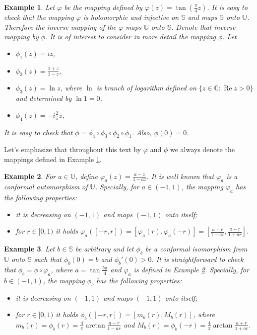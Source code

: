 \documentclass{amsart}
\newcommand{\re}{\mathop{\mathrm{Re}}}
\newtheorem{example}{Example}
\begin{document}
\begin{example}\label{exa:phi}
Let $\varphi$ be the mapping defined by $\displaystyle\varphi(z)=\tan{\left(\frac{\pi}{4}z\right)}$. It is easy to check that the
mapping $\varphi$ is holomorphic and injective on $\mathbb{S}$ and maps $\mathbb{S}$ onto $\mathbb{U}$. Therefore the inverse mapping of the $\varphi$ maps $\mathbb{U}$ onto $\mathbb{S}$. Denote that inverse mapping by $\phi$. It is of interest to consider in more detail the mapping $\phi$. Let
\begin{itemize}
  \item $\phi_{1}(z)=iz$,
  \item $\displaystyle\phi_{2}(z)=\frac{1+z}{1-z}$,
  \item $\phi_{3}(z)=\ln{z}$, where $\ln$ is branch of logarithm  defined on $\{z\in\mathbb{C}:\re{z}>0\}$ and determined by $\ln{1}=0$,
  \item $\displaystyle \phi_{4}(z)=-i\frac{2}{\pi}z$,
\end{itemize}
It is easy to check that $\phi=\phi_{4}\circ\phi_{3}\circ\phi_{2}\circ\phi_{1}$. Also, $\phi(0)=0$.
\end{example}

Let's emphasize that throughout this text by $\varphi$ and $\phi$ we always denote the mappings defined in Example \ref{exa:phi}.

\begin{example}\label{exa:varphia}
For  $a\in \mathbb{U}$, define $\displaystyle \varphi_a(z)= \frac{a-z}{1- \overline{a}z}$. It is well known that $\varphi_a$ is a conformal automorphism of $\mathbb{U}$. Specially, for $a\in(-1,1)$, the mapping $\varphi_a$ has the following properties:
\begin{itemize}
  \item[i)] it is decreasing on $(-1,1)$ and maps $(-1,1)$ onto itself;
  \item[ii)] for $r\in[0,1)$ it holds $\displaystyle \varphi_a([-r,r])=[\varphi_a(r),\varphi_a(-r)]=\left[\frac{a-r}{1-ar},\frac{a+r}{1+ar}\right]$.
\end{itemize}
\end{example}

\begin{example}\label{exa:phib}
Let $b\in\mathbb{S}$ be arbitrary and let $\phi_b$ be a conformal isomorphism from $\mathbb{U}$ onto $\mathbb{S}$ such that $\phi_b(0)=b$   and $\phi_b'(0) >0$. It is straightforward to check that $\phi_b= \phi\circ \varphi_a$, where  $\displaystyle a=\tan\frac{b\pi}{4}$ and $\varphi_a$ is defined in Example \ref{exa:varphia}. Specially, for $b\in(-1,1)$, the mapping $\phi_b$ has the following properties:
\begin{itemize}
  \item[i)]  it is decreasing on $(-1,1)$ and maps $(-1,1)$ onto itself;
  \item[ii)] for $r\in[0,1)$ it holds $\displaystyle \phi_b([-r,r])=[m_b(r),M_b(r)]$, where\\
  $\displaystyle m_b(r)=\phi_b(r)=\frac{4}{\pi}\arctan{\frac{a-r}{1-ar}}$ and $\displaystyle M_b(r)=\phi_b(-r)=\frac{4}{\pi}\arctan{\frac{a+r}{1+ar}}$.
\end{itemize}
\end{example}
\end{document}
